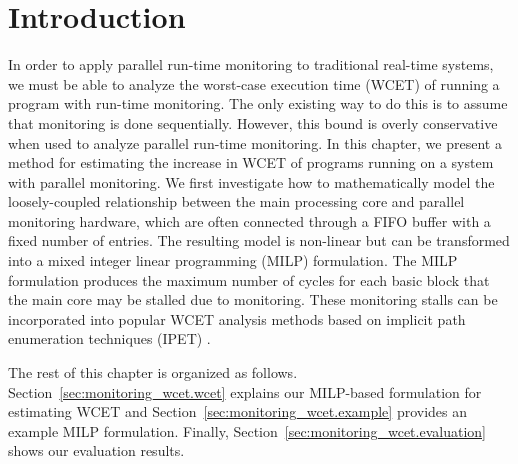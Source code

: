 \section{Introduction}
\label{sec:monitoring_wcet.introduction}

In order to apply parallel run-time monitoring to traditional real-time systems, we must
be able to analyze the worst-case execution time (WCET) of running a program
with run-time monitoring. The only existing way to do this is to assume that
monitoring is done sequentially. However, this bound is overly conservative when used to analyze parallel run-time monitoring.
In this chapter, we present a method for estimating the increase in WCET of
programs running on a system with parallel monitoring. We first investigate how
to mathematically model the loosely-coupled relationship between the main 
processing core and parallel monitoring hardware, which are often connected
through a FIFO buffer with a fixed number of entries. The resulting model
is non-linear but can be transformed into a mixed integer linear programming (MILP) 
formulation.
The MILP formulation produces the maximum number of cycles for each basic block
that the main core may be stalled due to monitoring.
These monitoring stalls can be incorporated into popular
WCET analysis methods based on implicit path enumeration techniques (IPET)
\cite{li-ipet-dac95}.

The rest of this chapter is organized as follows.
Section~\ref{sec:monitoring_wcet.wcet} explains our MILP-based formulation for
estimating WCET and Section~\ref{sec:monitoring_wcet.example} provides an
example MILP formulation. Finally, Section~\ref{sec:monitoring_wcet.evaluation}
shows our evaluation results.


